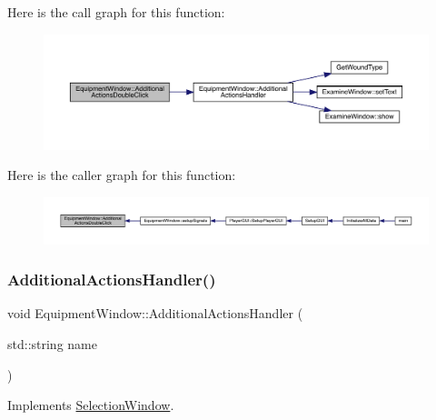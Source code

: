 Here is the call graph for this function\+:
\nopagebreak
\begin{figure}[H]
\begin{center}
\leavevmode
\includegraphics[width=350pt]{d8/dcb/class_equipment_window_abfd5a25ea90203e21291d6c6725b30f2_cgraph}
\end{center}
\end{figure}
Here is the caller graph for this function\+:
\nopagebreak
\begin{figure}[H]
\begin{center}
\leavevmode
\includegraphics[width=350pt]{d8/dcb/class_equipment_window_abfd5a25ea90203e21291d6c6725b30f2_icgraph}
\end{center}
\end{figure}
\mbox{\label{class_equipment_window_aa97046abad40cd1b4003fef694686992}} 
\subsubsection{\texorpdfstring{Additional\+Actions\+Handler()}{AdditionalActionsHandler()}}
{\footnotesize\ttfamily void Equipment\+Window\+::\+Additional\+Actions\+Handler (\begin{DoxyParamCaption}\item[{std\+::string}]{name }\end{DoxyParamCaption})\hspace{0.3cm}{\ttfamily [virtual]}}



Implements \mbox{\hyperlink{class_selection_window_aaa0131b5b67dc5b3f7ebb85835cd31a7}{Selection\+Window}}.

